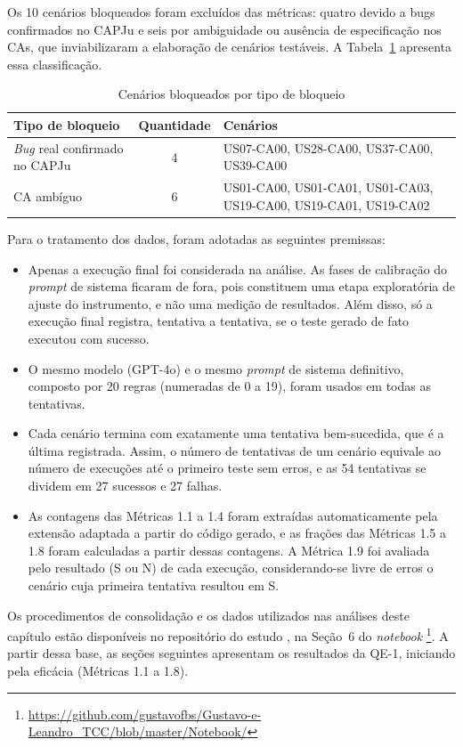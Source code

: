 Os 10 cenários bloqueados foram excluídos das métricas: quatro devido a bugs confirmados no CAPJu e seis por ambiguidade ou ausência de especificação nos CAs, que inviabilizaram a elaboração de cenários testáveis. A Tabela~\ref{tab:cenarios-bloqueados} apresenta essa classificação.

\begin{table}[htb]
\centering
\caption{Cenários bloqueados por tipo de bloqueio}
\label{tab:cenarios-bloqueados}
\begin{tabular}{p{5.2cm}cp{6.6cm}}
\hline
\textbf{Tipo de bloqueio} & \textbf{Quantidade} & \textbf{Cenários} \\
\hline
\textit{Bug} real confirmado no CAPJu & 4 & US07-CA00, US28-CA00, US37-CA00, US39-CA00 \\
CA ambíguo & 6 & US01-CA00, US01-CA01, US01-CA03, US19-CA00, US19-CA01, US19-CA02 \\
\hline
\end{tabular}
\end{table}

Para o tratamento dos dados, foram adotadas as seguintes premissas:

\begin{itemize}
    \item Apenas a execução final foi considerada na análise. As fases de calibração do \textit{prompt} de sistema ficaram de fora, pois constituem uma etapa exploratória de ajuste do instrumento, e não uma medição de resultados. Além disso, só a execução final registra, tentativa a tentativa, se o teste gerado de fato executou com sucesso.
    \item O mesmo modelo (GPT-4o) e o mesmo \textit{prompt} de sistema definitivo, composto por 20 regras (numeradas de 0 a 19), foram usados em todas as tentativas.
    \item Cada cenário termina com exatamente uma tentativa bem-sucedida, que é a última registrada. Assim, o número de tentativas de um cenário equivale ao número de execuções até o primeiro teste sem erros, e as 54 tentativas se dividem em 27 sucessos e 27 falhas.
    \item As contagens das Métricas 1.1 a 1.4 foram extraídas automaticamente pela extensão adaptada a partir do código gerado, e as frações das Métricas 1.5 a 1.8 foram calculadas a partir dessas contagens. A Métrica 1.9 foi avaliada pelo resultado (S ou N) de cada execução, considerando-se livre de erros o cenário cuja primeira tentativa resultou em S.
\end{itemize}

Os procedimentos de consolidação e os dados utilizados nas análises deste capítulo estão disponíveis no repositório do estudo \cite{repositorio-estudo}, na Seção~6 do \textit{notebook} \footnote{\url{https://github.com/gustavofbs/Gustavo-e-Leandro_TCC/blob/master/Notebook/}}. A partir dessa base, as seções seguintes apresentam os resultados da QE-1, iniciando pela eficácia (Métricas 1.1 a 1.8).
